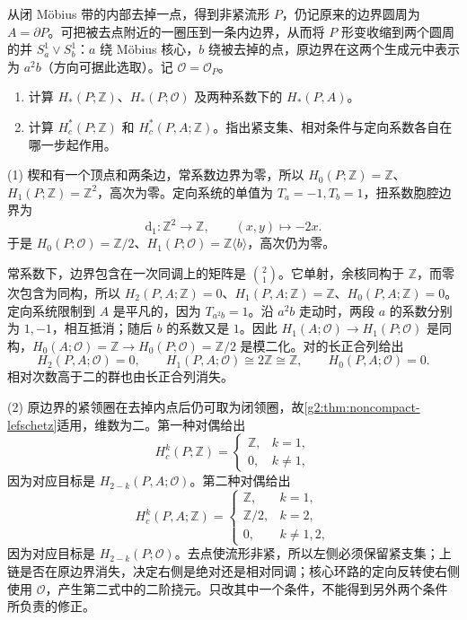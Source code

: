 \begin{exercise}\label{g2:ex:punctured-moebius-support}
	从闭 Möbius 带的内部去掉一点，得到非紧流形 \(P\)，仍记原来的边界圆周为 \(A=\partial P\)。可把被去点附近的一圈压到一条内边界，从而将 \(P\) 形变收缩到两个圆周的并 \(S^1_a\vee S^1_b\)：\(a\) 绕 Möbius 核心，\(b\) 绕被去掉的点，原边界在这两个生成元中表示为 \(a^2b\)（方向可据此选取）。记 \(\mathcal O=\mathcal O_P\)。
	\begin{enumerate}
		\item 计算 \(H_*(P;\mathbb Z)\)、\(H_*(P;\mathcal O)\) 及两种系数下的 \(H_*(P,A)\)。
		\item 计算 \(H_c^*(P;\mathbb Z)\) 和 \(H_c^*(P,A;\mathbb Z)\)。指出紧支集、相对条件与定向系数各自在哪一步起作用。
	\end{enumerate}
\end{exercise}
\begin{solution}
	(1) 楔和有一个顶点和两条边，常系数边界为零，所以 \(H_0(P;\mathbb Z)=\mathbb Z\)、\(H_1(P;\mathbb Z)=\mathbb Z^2\)，高次为零。定向系统的单值为 \(T_a=-1,T_b=1\)，扭系数胞腔边界为
	\[
		\mathrm d_1:\mathbb Z^2\longrightarrow\mathbb Z,\qquad
		(x,y)\longmapsto-2x.
	\]
	于是 \(H_0(P;\mathcal O)=\mathbb Z/2\)、\(H_1(P;\mathcal O)=\mathbb Z\langle b\rangle\)，高次仍为零。

	常系数下，边界包含在一次同调上的矩阵是 \(\binom{2}{1}\)。它单射，余核同构于 \(\mathbb Z\)，而零次包含为同构，所以 \(H_2(P,A;\mathbb Z)=0\)、\(H_1(P,A;\mathbb Z)=\mathbb Z\)、\(H_0(P,A;\mathbb Z)=0\)。定向系统限制到 \(A\) 是平凡的，因为 \(T_{a^2b}=1\)。沿 \(a^2b\) 走动时，两段 \(a\) 的系数分别为 \(1,-1\)，相互抵消；随后 \(b\) 的系数又是 \(1\)。因此 \(H_1(A;\mathcal O)\to H_1(P;\mathcal O)\) 是同构，\(H_0(A;\mathcal O)=\mathbb Z\to H_0(P;\mathcal O)=\mathbb Z/2\) 是模二化。对的长正合列给出
	\[
		H_2(P,A;\mathcal O)=0,\qquad
		H_1(P,A;\mathcal O)\cong2\mathbb Z\cong\mathbb Z,\qquad
		H_0(P,A;\mathcal O)=0.
	\]
	相对次数高于二的群也由长正合列消失。

	(2) 原边界的紧领圈在去掉内点后仍可取为闭领圈，故\cref{g2:thm:noncompact-lefschetz}适用，维数为二。第一种对偶给出
	\[
		H_c^k(P;\mathbb Z)=
		\begin{cases}
			\mathbb Z,&k=1,\\
			0,&k\ne1,
		\end{cases}
	\]
	因为对应目标是 \(H_{2-k}(P,A;\mathcal O)\)。第二种对偶给出
	\[
		H_c^k(P,A;\mathbb Z)=
		\begin{cases}
			\mathbb Z,&k=1,\\
			\mathbb Z/2,&k=2,\\
			0,&k\ne1,2,
		\end{cases}
	\]
	因为对应目标是 \(H_{2-k}(P;\mathcal O)\)。去点使流形非紧，所以左侧必须保留紧支集；上链是否在原边界消失，决定右侧是绝对还是相对同调；核心环路的定向反转使右侧使用 \(\mathcal O\)，产生第二式中的二阶挠元。只改其中一个条件，不能得到另外两个条件所负责的修正。
\end{solution}


